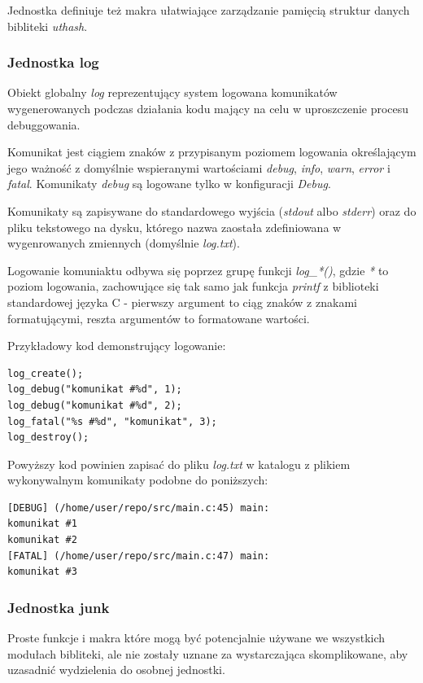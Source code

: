 Jednostka definiuje też makra ułatwiające zarządzanie pamięcią struktur danych bibliteki \textit{uthash}.


\subsubsection{Jednostka log}
Obiekt globalny \textit{log} reprezentujący system logowana komunikatów wygenerowanych podczas działania kodu mający na celu w uproszczenie procesu debuggowania.

Komunikat jest ciągiem znaków z przypisanym poziomem logowania określającym jego ważność z domyślnie wspieranymi wartościami \textit{debug}, \textit{info}, \textit{warn}, \textit{error} i \textit{fatal}.
Komunikaty \textit{debug} są logowane tylko w konfiguracji \textit{Debug}.

Komunikaty są zapisywane do standardowego wyjścia (\textit{stdout} albo \textit{stderr}) oraz do pliku tekstowego na dysku, którego nazwa zaostała zdefiniowana w wygenrowanych zmiennych (domyślnie \textit{log.txt}).

Logowanie komuniaktu odbywa się poprzez grupę funkcji \textit{log\_*()}, gdzie \textit{*} to poziom logowania, zachowujące się tak samo jak funkcja \textit{printf} z biblioteki standardowej języka C - pierwszy argument to ciąg znaków z znakami formatującymi, reszta argumentów to formatowane wartości.

Przykładowy kod demonstrujący logowanie:
\lstset{language=C}
\begin{lstlisting}[caption={Demonstracja logowania},captionpos=b]
log_create();
log_debug("komunikat #%d", 1);
log_debug("komunikat #%d", 2);
log_fatal("%s #%d", "komunikat", 3);
log_destroy();
\end{lstlisting}

Powyższy kod powinien zapisać do pliku \textit{log.txt} w katalogu z plikiem wykonywalnym komunikaty podobne do poniższych:
\lstset{language=verbatim}
\begin{lstlisting}[caption={Wynik logowania},captionpos=b]
[DEBUG] (/home/user/repo/src/main.c:45) main:
komunikat #1
komunikat #2
[FATAL] (/home/user/repo/src/main.c:47) main:
komunikat #3
\end{lstlisting}

\subsubsection{Jednostka junk}
Proste funkcje i makra które mogą być potencjalnie używane we wszystkich modułach bibliteki, ale nie zostały uznane za wystarczająca skomplikowane, aby uzasadnić wydzielenia do osobnej jednostki.

